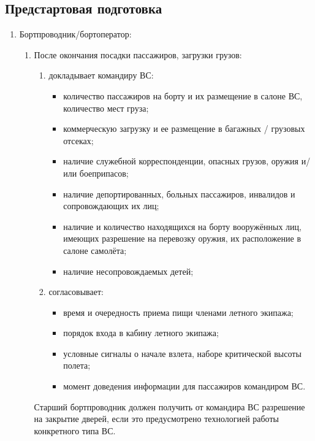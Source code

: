 \subsection{Предстартовая подготовка}
\begin{enumerate}
    \item Бортпроводник/бортоператор:
    \begin{enumerate}
        \item После окончания посадки пассажиров, загрузки грузов:
        \begin{enumerate}
            \item докладывает командиру ВС:
            \begin{itemize}
                \item количество пассажиров на борту и их размещение в салоне ВС, количество мест груза;
                \item коммерческую загрузку и ее размещение в багажных / грузовых отсеках;
                \item наличие служебной корреспонденции, опасных грузов, оружия и/или боеприпасов;
                \item наличие депортированных, больных пассажиров, инвалидов и сопровождающих их лиц;
                \item наличие и количество находящихся на борту вооружённых лиц, имеющих разрешение на перевозку оружия, их расположение в салоне самолёта;
                \item наличие несопровождаемых детей;
            \end{itemize}
            \item согласовывает:
            \begin{itemize}
                \item время и очередность приема пищи членами летного экипажа;
                \item порядок входа в кабину летного экипажа;
                \item условные сигналы о начале взлета, наборе критической высоты полета;
                \item момент доведения информации для пассажиров командиром ВС.
            \end{itemize}    
        \end{enumerate}
        Старший бортпроводник должен получить от командира ВС разрешение на закрытие дверей, если это предусмотрено технологией работы конкретного типа ВС.


\end{enumerate}
\end{enumerate}
